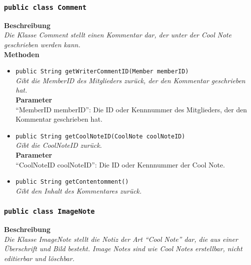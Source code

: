 \subsubsection{\texttt{public class Comment}}

	\textbf{Beschreibung} \\
	\textit{Die Klasse Comment stellt einen Kommentar dar, der unter der Cool Note geschrieben werden kann.} \\
	
	\textbf{Methoden}
	\begin{itemize}
		\item\texttt{{public String getWriterCommentID(Member memberID)}}\\
		\textit{Gibt die MemberID des Mitglieders zurück, der den Kommentar geschrieben hat.}\\
		\textbf{Parameter}\\
		“MemberID memberID”: Die ID oder Kennnummer des Mitglieders, der den Kommentar geschrieben hat.\\
		
		\item\texttt{{public String getCoolNoteID(CoolNote coolNoteID)}}\\
		\textit{Gibt die CoolNoteID zurück.}\\
		\textbf{Parameter}\\
		“CoolNoteID coolNoteID”: Die ID oder Kennnummer der Cool Note.\\
		
		\item\texttt{{public String getContentomment()}}\\
		\textit{Gibt den Inhalt des Kommentares zurück.}\\
	\end{itemize}

\subsubsection{\texttt{public class ImageNote}}

	\textbf{Beschreibung} \\
	\textit{Die Klasse ImageNote stellt die Notiz der Art “Cool Note” dar, die aus einer Überschrift und Bild besteht. Image Notes sind wie Cool Notes erstellbar, nicht editierbar und löschbar.} \\
	
